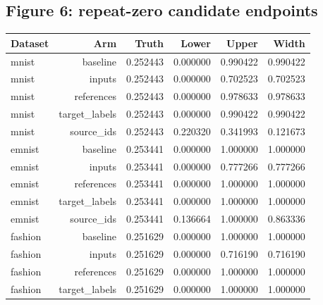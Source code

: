 \reservetable
\subsection{Figure 6: repeat-zero candidate endpoints}

\begingroup\small
\setlength{\tabcolsep}{4pt}
\begin{longtable}{lrrrrr}
\toprule

Dataset & Arm & Truth & Lower & Upper & Width\\\midrule\endhead

mnist & baseline & 0.252443 & 0.000000 & 0.990422 & 0.990422\\

mnist & inputs & 0.252443 & 0.000000 & 0.702523 & 0.702523\\

mnist & references & 0.252443 & 0.000000 & 0.978633 & 0.978633\\

mnist & target\_labels & 0.252443 & 0.000000 & 0.990422 & 0.990422\\

mnist & source\_ids & 0.252443 & 0.220320 & 0.341993 & 0.121673\\

emnist & baseline & 0.253441 & 0.000000 & 1.000000 & 1.000000\\

emnist & inputs & 0.253441 & 0.000000 & 0.777266 & 0.777266\\

emnist & references & 0.253441 & 0.000000 & 1.000000 & 1.000000\\

emnist & target\_labels & 0.253441 & 0.000000 & 1.000000 & 1.000000\\

emnist & source\_ids & 0.253441 & 0.136664 & 1.000000 & 0.863336\\

fashion & baseline & 0.251629 & 0.000000 & 1.000000 & 1.000000\\

fashion & inputs & 0.251629 & 0.000000 & 0.716190 & 0.716190\\

fashion & references & 0.251629 & 0.000000 & 1.000000 & 1.000000\\

fashion & target\_labels & 0.251629 & 0.000000 & 1.000000 & 1.000000\\


\end{longtable}
